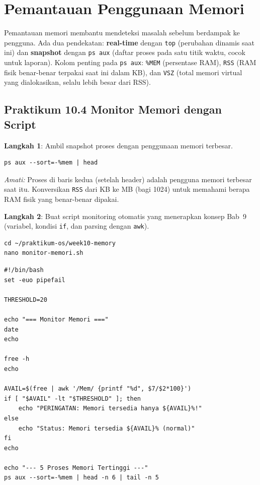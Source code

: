 \section{Pemantauan Penggunaan Memori}

Pemantauan memori membantu mendeteksi masalah sebelum berdampak ke pengguna. Ada
dua pendekatan: \textbf{real-time} dengan \texttt{top} (perubahan dinamis saat ini)
dan \textbf{snapshot} dengan \texttt{ps aux} (daftar proses pada satu titik waktu,
cocok untuk laporan). Kolom penting pada \texttt{ps aux}: \texttt{\%MEM} (persentase
RAM), \texttt{RSS} (RAM fisik benar-benar terpakai saat ini dalam KB), dan
\texttt{VSZ} (total memori virtual yang dialokasikan, selalu lebih besar dari RSS).

\subsection*{Praktikum 10.4 Monitor Memori dengan Script}

\textbf{Langkah 1}: Ambil snapshot proses dengan penggunaan memori terbesar.

\begin{lstlisting}[caption={Proses dengan memori terbesar}]
ps aux --sort=-%mem | head
\end{lstlisting}

\textit{Amati:} Proses di baris kedua (setelah header) adalah pengguna memori
terbesar saat itu. Konversikan \texttt{RSS} dari KB ke MB (bagi 1024) untuk
memahami berapa RAM fisik yang benar-benar dipakai.

\textbf{Langkah 2}: Buat script monitoring otomatis yang menerapkan konsep Bab~9
(variabel, kondisi \texttt{if}, dan parsing dengan \texttt{awk}).

\begin{lstlisting}[caption={Pindah ke direktori dan buka nano}]
cd ~/praktikum-os/week10-memory
nano monitor-memori.sh
\end{lstlisting}

\begin{lstlisting}[caption={Isi file monitor-memori.sh}]
#!/bin/bash
set -euo pipefail

THRESHOLD=20

echo "=== Monitor Memori ==="
date
echo

free -h
echo

AVAIL=$(free | awk '/Mem/ {printf "%d", $7/$2*100}')
if [ "$AVAIL" -lt "$THRESHOLD" ]; then
    echo "PERINGATAN: Memori tersedia hanya ${AVAIL}%!"
else
    echo "Status: Memori tersedia ${AVAIL}% (normal)"
fi
echo

echo "--- 5 Proses Memori Tertinggi ---"
ps aux --sort=-%mem | head -n 6 | tail -n 5
\end{lstlisting}


